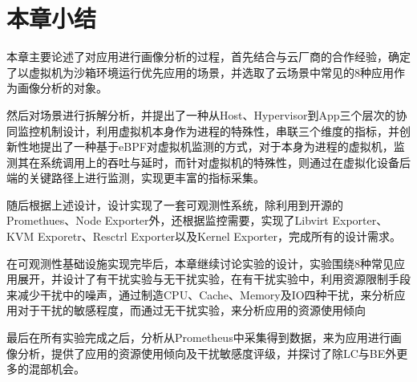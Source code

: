 


\section{本章小结}

本章主要论述了对应用进行画像分析的过程，首先结合与云厂商的合作经验，确定了以虚拟机为沙箱环境运行优先应用的场景，并选取了云场景中常见的8种应用作为画像分析的对象。

然后对场景进行拆解分析，并提出了一种从Host、Hypervisor到App三个层次的协同监控机制设计，利用虚拟机本身作为进程的特殊性，串联三个维度的指标，并创新性地提出了一种基于eBPF对虚拟机监测的方式，对于本身为进程的虚拟机，监测其在系统调用上的吞吐与延时，而针对虚拟机的特殊性，则通过在虚拟化设备后端的关键路径上进行监测，实现更丰富的指标采集。

随后根据上述设计，设计实现了一套可观测性系统，除利用到开源的Promethues、Node Exporter外，还根据监控需要，实现了Libvirt Exporter、KVM Exporetr、Resctrl Exporter以及Kernel Exporter，完成所有的设计需求。

在可观测性基础设施实现完毕后，本章继续讨论实验的设计，实验围绕8种常见应用展开，并设计了有干扰实验与无干扰实验，在有干扰实验中，利用资源限制手段来减少干扰中的噪声，通过制造CPU、Cache、Memory及IO四种干扰，来分析应用对于干扰的敏感程度，而通过无干扰实验，来分析应用的资源使用倾向

最后在所有实验完成之后，分析从Prometheus中采集得到数据，来为应用进行画像分析，提供了应用的资源使用倾向及干扰敏感度评级，并探讨了除LC与BE外更多的混部机会。

